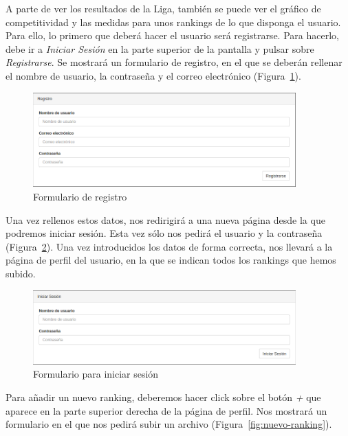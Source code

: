A parte de ver los resultados de la Liga, también se puede ver el gráfico de competitividad y las medidas para unos rankings de lo que disponga el usuario. Para ello, lo primero que deberá hacer el usuario será registrarse. Para hacerlo, debe ir a \emph{Iniciar Sesión} en la parte superior de la pantalla y pulsar sobre \emph{Registrarse}. Se mostrará un formulario de registro, en el que se deberán rellenar el nombre de usuario, la contraseña y el correo electrónico (Figura~\ref{fig:registro}).\\  

\begin{figure}[htb]
\centering
\includegraphics[width=0.9\textwidth]{imagenes/pantallazos-aplicacion/registro}
\caption{Formulario de registro}
\label{fig:registro}
\end{figure}

Una vez rellenos estos datos, nos redirigirá a una nueva página desde la que podremos iniciar sesión. Esta vez sólo nos pedirá el usuario y la contraseña (Figura~\ref{fig:inicio-sesion}). Una vez introducidos los datos de forma correcta, nos llevará a la página de perfil del usuario, en la que se indican todos los rankings que hemos subido. 

\begin{figure}[htb]
\centering
\includegraphics[width=0.9\textwidth]{imagenes/pantallazos-aplicacion/inicio-sesion}
\caption{Formulario para iniciar sesión}
\label{fig:inicio-sesion}
\end{figure}

Para añadir un nuevo ranking, deberemos hacer click sobre el botón \emph{+} que aparece en la parte superior derecha de la página de perfil. Nos mostrará un formulario en el que nos pedirá subir un archivo (Figura~\ref{fig:nuevo-ranking}). \\

